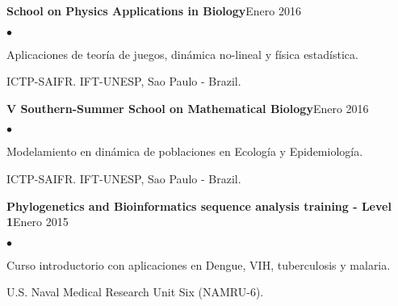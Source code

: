 \documentclass[margin,line]{res}
\newenvironment{list2}{
	\begin{list}{$\bullet$}{%
			\setlength{\itemsep}{0in}
			\setlength{\parsep}{0in} \setlength{\parskip}{0in}
			\setlength{\topsep}{0in} \setlength{\partopsep}{0in}
			\setlength{\leftmargin}{0.2in}}}{\end{list}}
\begin{document}
\begin{resume}
		{\bf School on Physics Applications in Biology}\hfill {Enero 2016}\\
		\vspace*{-.1in}%
		\begin{list2} %
			\item Aplicaciones de teoría de juegos, dinámica no-lineal y física estadística.
			\item ICTP-SAIFR. IFT-UNESP, Sao Paulo - Brazil. %
		\end{list2}
		
		{\bf V Southern-Summer School on Mathematical Biology}\hfill {Enero 2016}\\
		\vspace*{-.1in}%
		\begin{list2} %
			\item Modelamiento en dinámica de poblaciones en Ecología y Epidemiología.
			\item ICTP-SAIFR. IFT-UNESP, Sao Paulo - Brazil.
		\end{list2}
		
		{\bf Phylogenetics and Bioinformatics sequence analysis training - Level 1}\hfill {Enero 2015}\\
		\vspace*{-.1in}
		\begin{list2} %
			\item Curso introductorio con aplicaciones en Dengue, VIH, tuberculosis y malaria.
			\item U.S. Naval Medical Research Unit Six (NAMRU-6).%
		\end{list2}
		
		

\end{resume}
\end{document}
